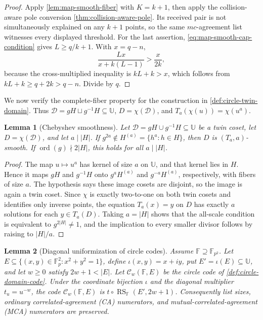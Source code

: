 \documentclass[11pt,a4paper]{amsart}
\numberwithin{equation}{section}
\newtheorem{lemma}[lemma]{Lemma}
\theoremstyle{remark}
\DeclareMathOperator{\RS}{RS}
\DeclareMathOperator{\ord}{ord}
\newcommand{\F}{\mathbb F}
\newcommand{\Ccal}{\mathcal C}
\newcommand{\Dcal}{\mathcal D}
\newcommand{\UU}{\mathbb U}
\newcommand{\abs}[1]{\lvert #1\rvert}
\begin{document}
\begin{proof}
Apply \cref{lem:map-smooth-fiber} with \(K=k+1\), then apply the
collision-aware pole conversion \cref{thm:collision-aware-pole}.  Its
received pair is not simultaneously explained on any \(k+1\) points, so
the same \(mc\)-agreement list witnesses every displayed threshold.
For the last assertion, \eqref{eq:map-smooth-cap-condition} gives
\(L\ge q/k+1\).  With \(x=q-n\),
\[
 \frac{Lx}{x+k(L-1)}>\frac{x}{2k},
\]
because the cross-multiplied inequality is \(kL+k>x\), which follows
from \(kL+k\ge q+2k>q-n\).  Divide by \(q\).
\end{proof}

We now verify the complete-fiber property for the construction in
\cref{def:circle-twin-domain}.  Thus
\(\Dcal=gH\sqcup g^{-1}H\subseteq\UU\),
\(D=\chi(\Dcal)\), and \(T_a(\chi(u))=\chi(u^a)\).

\begin{lemma}[Chebyshev smoothness]\label{lem:cheb-smooth}
Let \(\Dcal=gH\cup g^{-1}H\subseteq\UU\) be a twin coset, let \(D=\chi(\Dcal)\), and let \(a\mid\abs H\).  If \(g^{2a}\notin H^{(a)}=\{h^a:h\in H\}\), then \(D\) is \((T_a,a)\)-smooth.  If \(\ord(g)\nmid2\abs H\), this holds for all \(a\mid\abs H\).
\end{lemma}

\begin{proof}
The map \(u\mapsto u^a\) has kernel of size \(a\) on \(\UU\), and that kernel lies in \(H\).  Hence it maps \(gH\) and \(g^{-1}H\) onto \(g^aH^{(a)}\) and \(g^{-a}H^{(a)}\), respectively, with fibers of size \(a\).  The hypothesis says these image cosets are disjoint, so the image is again a twin coset.  Since \(\chi\) is exactly two-to-one on both twin cosets and identifies only inverse points, the equation \(T_a(x)=y\) on \(D\) has exactly \(a\) solutions for each \(y\in T_a(D)\).  Taking \(a=\abs H\) shows that the all-scale condition is equivalent to \(g^{2\abs H}\ne1\), and the implication to every smaller divisor follows by raising to \(\abs H/a\).
\end{proof}

\begin{lemma}[Diagonal uniformization of circle codes]\label{lem:circle-uniformization}
Assume \(\F\supseteq\F_{p^2}\).  Let
\(E\subseteq\{(x,y)\in\F_p^2:x^2+y^2=1\}\), define
\(\iota(x,y)=x+iy\), put \(E'=\iota(E)\subseteq\UU\), and let
\(w\ge0\) satisfy \(2w+1<\abs E\).  Let
\(\Ccal_w(\F,E)\) be the circle code of
\cref{def:circle-domain-code}.  Under the coordinate bijection \(\iota\)
and the diagonal multiplier \(t_u=u^{-w}\), the code
\(\Ccal_w(\F,E)\) is \(t\circ\RS_\F(E',2w+1)\).
Consequently list sizes, ordinary correlated-agreement (CA) numerators,
and mutual-correlated-agreement (MCA) numerators are preserved.
\end{lemma}
\end{document}
